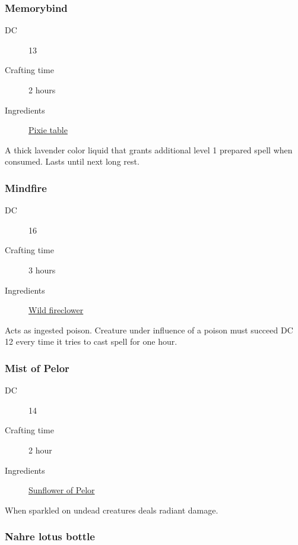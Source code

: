 \subsubsection{Memorybind}
\label{Memorybind}

\begin{description}
\item [DC] 13 \arcana
\item [Crafting time] 2 hours
\item [Ingredients] \hyperref[Pixie table]{Pixie table}
\end{description}

A thick lavender color liquid that grants additional level 1 prepared spell when consumed. Lasts until next long rest.

\subsubsection{Mindfire}
\label{Mindfire}

\begin{description}
\item [DC] 16 \nature
\item [Crafting time] 3 hours
\item [Ingredients] \hyperref[Wild Fireclover]{Wild fireclower}
\end{description}

Acts as ingested poison. Creature under influence of a poison must succeed DC 12 \wisdomsave every time it tries to cast spell for one hour.

\subsubsection{Mist of Pelor}
\label{Mist of Pelor}

\begin{description}
\item [DC] 14 \religion
\item [Crafting time] 2 hour
\item [Ingredients] \hyperref[Sunflower of Pelor]{Sunflower of Pelor}
\end{description}

When sparkled on undead creatures deals  radiant damage.

\subsubsection{Nahre lotus bottle}
\label{Nahre lotus bottle}

